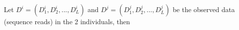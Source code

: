 \documentclass[a4paper, 11pt]{article}
\begin{document}
 Let $D^{i}=(D^{i}_1,D^{i}_2,...,D^{i}_L)$ and $D^{j}=(D^{j}_1,D^{j}_2,...,D^{j}_L)$ be the observed data (sequence reads) in the 2 individuals, then %
\end{document}
